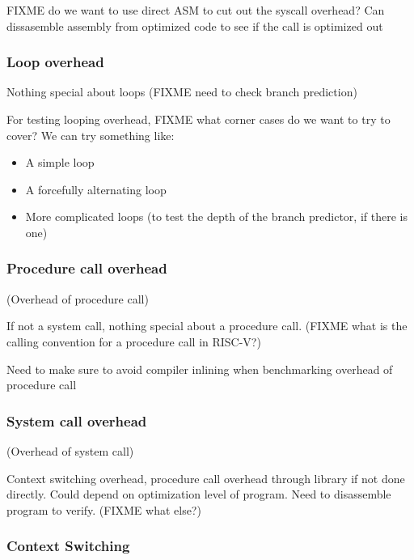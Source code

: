 \documentclass{article}
\begin{document}
FIXME do we want to use direct ASM to cut out the syscall overhead? Can dissasemble assembly from optimized code to see if the call is optimized out

\subsubsection{Loop overhead}

Nothing special about loops (FIXME need to check branch prediction)

For testing looping overhead, FIXME what corner cases do we want to try to cover? We can try something like:
\begin{itemize}
    \item A simple loop
    \item A forcefully alternating loop
    \item More complicated loops (to test the depth of the branch predictor, if there is one)
\end{itemize}

\subsubsection{Procedure call overhead}
(Overhead of procedure call)

If not a system call, nothing special about a procedure call. (FIXME what is the calling convention for a procedure call in RISC-V?)

Need to make sure to avoid compiler inlining when benchmarking overhead of procedure call

\subsubsection{System call overhead} \label{sec:syscalls}
(Overhead of system call)

Context switching overhead, procedure call overhead through library if not done directly. Could depend on optimization level of program. Need to disassemble program to verify. (FIXME what else?)


\subsubsection{Context Switching}
\end{document}
